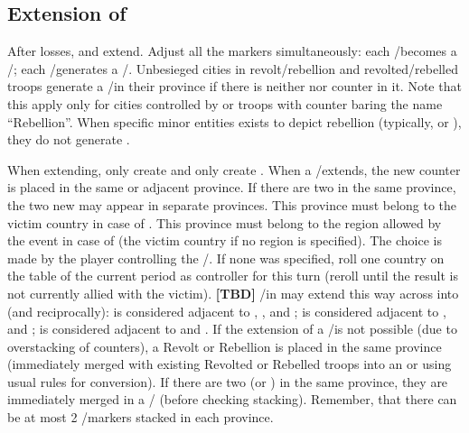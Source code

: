 \subsection{Extension of \REVOLT}
\label{chRedep:Extension Revolts}
 After \STAB losses, \REVOLT and \REBELLION extend. Adjust
all the markers simultaneously:
\bparag each \REVOLT/\REBELLION\facemoins becomes a
\REVOLT/\REBELLION\faceplus;
\bparag each \REVOLT/\REBELLION\faceplus generates a
\REVOLT/\REBELLION\facemoins.
\bparag Unbesieged cities in revolt/rebellion and revolted/rebelled troops
generate a \REVOLT/\REBELLION\facemoins in their province if there is neither
\REVOLT nor \REBELLION counter in it.
\bparag Note that this apply only for cities controlled by or troops with
counter baring the name ``Rebellion''. When specific minor entities exists to
depict rebellion (typically,  or ), they do
not generate \REBELLION.

\bparag When extending, \REVOLT only create \REVOLT and \REBELLION only create
\REBELLION.
\bparag When a \REVOLT/\REBELLION\Faceplus extends, the new counter is placed 
in the same or adjacent province. If there are two \REVOLT\Faceplus in the
same province, the two new \REVOLT\Facemoins may appear in separate
provinces.
\bparag This province must belong to the victim country in case of \REVOLT.
\bparag This province must belong to the region allowed by the event in case
of \REBELLION (the victim country if no region is specified).
\bparag The choice is made by the player controlling the
\REVOLT/\REBELLION. If none was specified, roll one country on the \REVOLT
table of the current period as controller for this turn (reroll until the
result is not currently allied with the victim).
\bparag \textbf{[TBD]} \REVOLT/\REBELLION in \regionIrlande may extend this
way across \seazoneMan into \ANG (and reciprocally): \provinceUlster is
considered adjacent to \provinceAlba, \provinceAyr, \provinceGalloway and
\provinceCumberland ; \provinceBrega is considered adjacent to
\provinceCumberland, \provinceLancashire and \provinceCymru ;
\provinceLeinster is considered adjacent to \provinceCymru and
\provinceCornwall.
\bparag If the extension of a \REVOLT/\REBELLION\faceplus is not possible (due
to overstacking of counters), a Revolt or Rebellion \LD is placed in the same
province (immediately merged with existing Revolted or Rebelled troops into an
\ARMY\Facemoins or \ARMY\Faceplus using usual rules for conversion).
\bparag If there are two \REVOLT\Facemoins (or \REBELLION\Facemoins) in the
same province, they are immediately merged in a \REVOLT/\REBELLION\Faceplus
(before checking stacking).
\bparag Remember, that there can be at most 2 \REVOLT/\REBELLION markers
stacked in each province.

